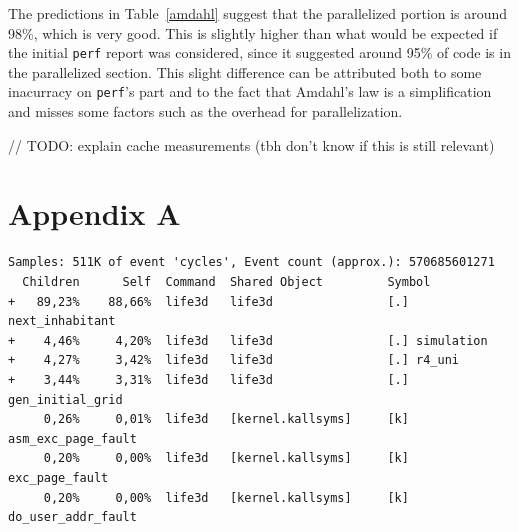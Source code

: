 \documentclass{article}
\begin{document}
The predictions in Table~\ref{amdahl} suggest that the parallelized portion is
around 98\%, which is very good. This is slightly higher than what would be
expected if the initial \texttt{perf} report was considered, since it suggested
around 95\% of code is in the parallelized section. This slight difference
can be attributed both to some inacurracy on \texttt{perf}'s part and to the
fact that Amdahl's law is a simplification and misses some factors such as the
overhead for parallelization.


// TODO: explain cache measurements (tbh don't know if this is still relevant)

\section{Appendix A}

\begin{lstlisting}[caption={\texttt{perf} report on run with $n=1024$ and $3$
generations}]
Samples: 511K of event 'cycles', Event count (approx.): 570685601271
  Children      Self  Command  Shared Object         Symbol
+   89,23%    88,66%  life3d   life3d                [.] next_inhabitant
+    4,46%     4,20%  life3d   life3d                [.] simulation
+    4,27%     3,42%  life3d   life3d                [.] r4_uni
+    3,44%     3,31%  life3d   life3d                [.] gen_initial_grid
     0,26%     0,01%  life3d   [kernel.kallsyms]     [k] asm_exc_page_fault
     0,20%     0,00%  life3d   [kernel.kallsyms]     [k] exc_page_fault
     0,20%     0,00%  life3d   [kernel.kallsyms]     [k] do_user_addr_fault
\end{lstlisting}

\newpage



% 

\end{document}
